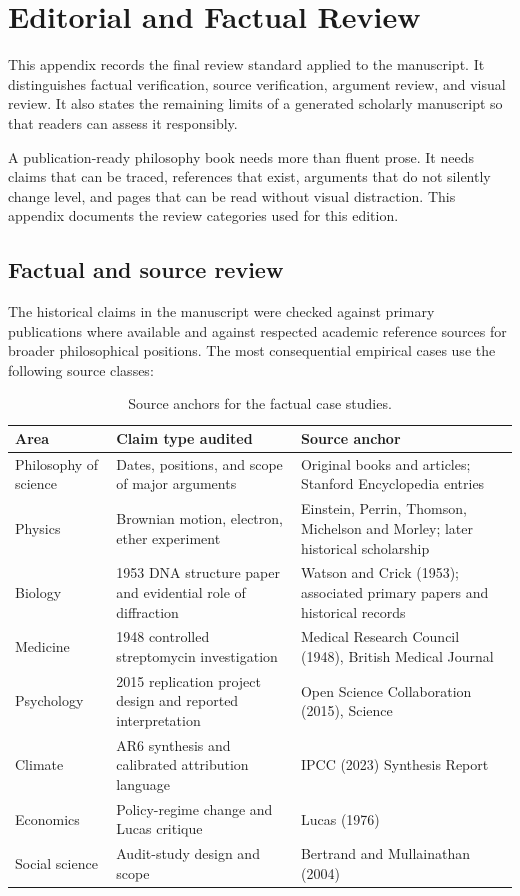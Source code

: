 \chapter{Editorial and Factual Review}
\label{ch:audit}

\begin{chapterguide}
This appendix records the final review standard applied to the manuscript. It
distinguishes factual verification, source verification, argument review, and
visual review. It also states the remaining limits of a generated scholarly
manuscript so that readers can assess it responsibly.
\end{chapterguide}

A publication-ready philosophy book needs more than fluent prose. It needs
claims that can be traced, references that exist, arguments that do not
silently change level, and pages that can be read without visual distraction.
This appendix documents the review categories used for this edition.

\section{Factual and source review}

The historical claims in the manuscript were checked against primary
publications where available and against respected academic reference sources
for broader philosophical positions. The most consequential empirical cases
use the following source classes:

\begin{table}[ht]
\centering
\smalltable
\begin{tabularx}{\textwidth}{p{}Y Y}
\toprule
Area & Claim type audited & Source anchor\\
\midrule
Philosophy of science & Dates, positions, and scope of major arguments & Original books and articles; Stanford Encyclopedia entries\\
Physics & Brownian motion, electron, ether experiment & Einstein, Perrin, Thomson, Michelson and Morley; later historical scholarship\\
Biology & 1953 DNA structure paper and evidential role of diffraction & Watson and Crick (1953); associated primary papers and historical records\\
Medicine & 1948 controlled streptomycin investigation & Medical Research Council (1948), British Medical Journal\\
Psychology & 2015 replication project design and reported interpretation & Open Science Collaboration (2015), Science\\
Climate & AR6 synthesis and calibrated attribution language & IPCC (2023) Synthesis Report\\
Economics & Policy-regime change and Lucas critique & Lucas (1976)\\
Social science & Audit-study design and scope & Bertrand and Mullainathan (2004)\\
\bottomrule
\end{tabularx}
\caption{Source anchors for the factual case studies.}
\label{tab:audit-sources}
\end{table}

